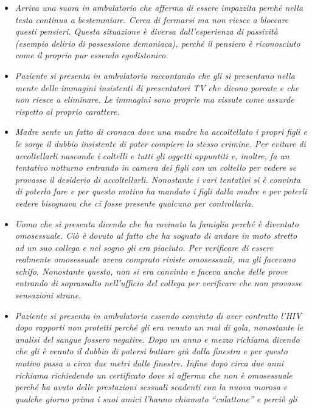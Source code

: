 \documentclass[]{article}
\begin{document}
\begin{itemize}
\item
  \emph{Arriva una suora in ambulatorio che afferma di essere impazzita
  perché nella testa continua a bestemmiare. Cerca di fermarsi ma non
  riesce a bloccare questi pensieri. Questa situazione è diversa
  dall'esperienza di passività (esempio delirio di possessione
  demoniaca), perché il pensiero è riconosciuto come il proprio pur
  essendo egodistonico.}
\item
  \emph{Paziente si presenta in ambulatorio raccontando che gli si
  presentano nella mente delle immagini insistenti di presentatori TV
  che dicono porcate e che non riesce a eliminare. Le immagini sono
  proprie ma vissute come assurde rispetto al proprio carattere.}
\item
  \emph{Madre sente un fatto di cronaca dove una madre ha accoltellato i
  propri figli e le sorge il dubbio insistente di poter compiere lo
  stesso crimine. Per evitare di accoltellarli nasconde i coltelli e
  tutti gli oggetti appuntiti e, inoltre, fa un tentativo notturno
  entrando in camera dei figli con un coltello per vedere se provasse il
  desiderio di accoltellarli. Nonostante i vari tentativi si è convinta
  di poterlo fare e per questo motivo ha mandato i figli dalla madre e
  per poterli vedere bisognava che ci fosse presente qualcuno per
  controllarla.}
\item
  \emph{Uomo che si presenta dicendo che ha rovinato la famiglia perché
  è diventato omosessuale. Ciò è dovuto al fatto che ha sognato di
  andare in moto stretto ad un suo collega e nel sogno gli era piaciuto.
  Per verificare di essere realmente omosessuale aveva comprato riviste
  omosessuali, ma gli facevano schifo. Nonostante questo, non si era
  convinto e faceva anche delle prove entrando di soprassalto
  nell'ufficio del collega per verificare che non provasse sensazioni
  strane.}
\item
  \emph{Paziente si presenta in ambulatorio essendo convinto di aver
  contratto l'HIV dopo rapporti non protetti perché gli era venuto un
  mal di gola, nonostante le analisi del sangue fossero negative. Dopo
  un anno e mezzo richiama dicendo che gli è venuto il dubbio di potersi
  buttare giù dalla finestra e per questo motivo passa a circa due metri
  dalle finestre. Infine dopo circa due anni richiama richiedendo un
  certificato dove si afferma che non è omosessuale perché ha avuto
  delle prestazioni sessuali scadenti con la nuova morosa e qualche
  giorno prima i suoi amici l'hanno chiamato ``culattone'' e perciò gli
}
\end{itemize}
\end{document}
